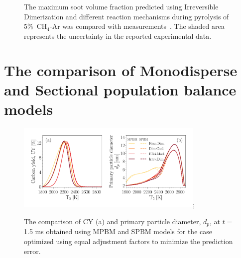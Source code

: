 \begin{figure}[H]
	\centering
	\caption{The maximum soot volume fraction predicted using Irreversible Dimerization and different reaction mechanisms during pyrolysis of 5\%~$\mathrm{CH_4}$-Ar was compared with measurements~\citep{clack2025}. The shaded area represents the uncertainty in the reported experimental data.}
	\label{fig:max_sootfv_chem} 
\end{figure}

\section{The comparison of Monodisperse and Sectional population balance models}

\begin{figure}[H]
	\centering
	\includegraphics[width=0.8\textwidth]{Figures/Results/Shocktube/Agafonov2016_cpr/carbon_yield_d_p_pdynamics.pdf};
	\caption{The comparison of CY (a) and primary particle diameter, $d_p$, at $t=$1.5 ms obtained using MPBM and SPBM models for the case optimized using equal adjustment factors to minimize the prediction error.}
	\label{fig:shockagof_yield_dp_cpr_pdynamics} 
\end{figure}



